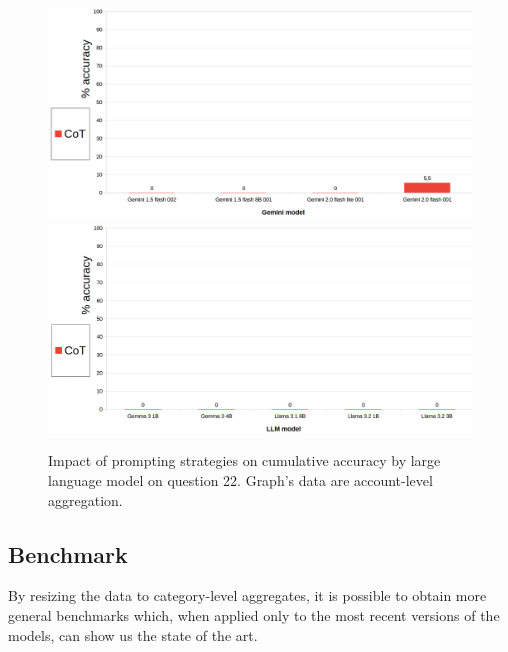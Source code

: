 \documentclass[12pt]{article}
\begin{document}
\begin{figure}[H]
    \centering
            \includegraphics[width=1\textwidth]{q309Gemini.png}
            \includegraphics[width=1\textwidth]{q309Other.png}
    \caption[Accuracy on Question 22 by LLM]{Impact of prompting strategies on cumulative accuracy by large language model on question 22. Graph's data are account-level aggregation.}
    \end{figure} 

\vspace{2cm}

\subsection{Benchmark}
By resizing the data to category-level aggregates, it is possible to obtain more general benchmarks which, when applied only to the most recent versions of the models, can show us the state of the art.\\
\end{document}
